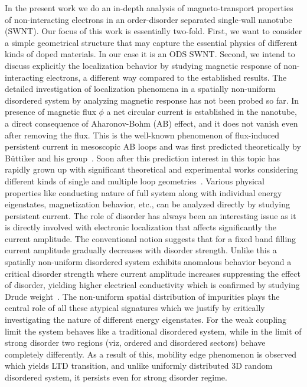 \documentclass[prb,aps,twocolumn,amsmath,amssymb,floatfix,
superscriptaddress]{revtex4}
\begin{document}
In the present work we do an in-depth analysis of magneto-transport properties 
of non-interacting electrons in an order-disorder separated single-wall 
nanotube (SWNT). Our focus of this work is essentially two-fold. First, we 
want to consider a simple geometrical structure that may capture the essential 
physics of different 
kinds of doped materials. In our case it is an ODS SWNT. Second, we intend to 
discuss explicitly the localization behavior by studying magnetic response of 
non-interacting electrons, a different way compared to the established results.
The detailed investigation of localization phenomena in a spatially non-uniform
disordered system by analyzing magnetic response has not been probed so far. 
In presence of magnetic flux $\phi$ a net circular current is established in the 
nanotube, a direct consequence of Aharonov-Bohm (AB) effect, and it does not 
vanish even after removing the flux. This is the well-known phenomenon of 
flux-induced persistent current in mesoscopic AB loops and was first predicted 
theoretically by B\"{u}ttiker 
and his group~\cite{pc1}. Soon after this prediction interest in this topic 
has rapidly grown up with significant theoretical and experimental works 
considering different kinds of single and multiple loop geometries~\cite{pc2,pc3,
pc4,pc5,pc6,pc7,pc8,pc8a,pc9,pc10,pc11,skm2,skm3,skm5}. Various physical 
properties like conducting nature of full system along with individual energy
eigenstates, magnetization behavior, etc., can be analyzed directly by 
studying persistent current. The role of disorder has always been an 
interesting issue as it is directly involved with electronic localization 
that affects significantly the current amplitude. The conventional notion
suggests that for a fixed band filling current amplitude gradually decreases
with disorder strength. Unlike this a spatially non-uniform disordered system 
exhibits anomalous behavior beyond a critical disorder strength where current
amplitude increases suppressing the effect of disorder, yielding higher 
electrical conductivity which is confirmed by studying Drude 
weight~\cite{kohn,bouz,skm4}. 
The non-uniform spatial distribution of impurities plays the central role of all
these atypical signatures which we justify by critically investigating the
nature of different energy eigenstates. For the weak coupling limit the 
system behaves like a traditional disordered system, while in the limit of 
strong disorder two regions (viz, ordered and disordered sectors) behave 
completely differently. As a result of this, mobility edge phenomenon is 
observed which yields LTD transition, and unlike uniformly distributed
3D random disordered system, it persists even for strong disorder regime. 
\end{document}
